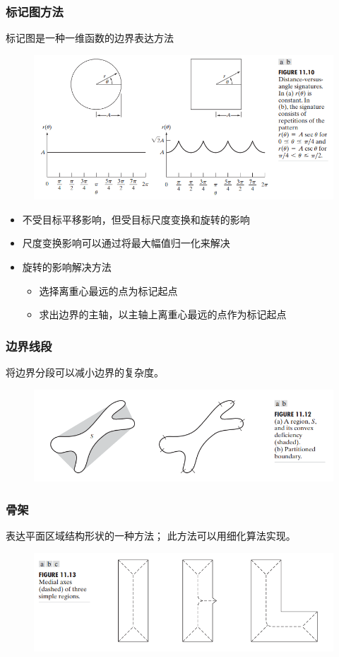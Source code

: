 \subsubsection{标记图方法}
标记图是一种一维函数的边界表达方法
\begin{figure}[H]
\centering
\includegraphics[width=0.8\linewidth]{fig/signature.png}
\end{figure}
\begin{itemize}
\item 不受目标平移影响，但受目标尺度变换和旋转的影响
\item 尺度变换影响可以通过将最大幅值归一化来解决
\item 旋转的影响解决方法
\begin{itemize}
	\item 选择离重心最远的点为标记起点
	\item 求出边界的主轴，以主轴上离重心最远的点作为标记起点
\end{itemize}
\end{itemize}

\subsubsection{边界线段}
将边界分段可以减小边界的复杂度。
\begin{figure}[H]
\centering
\includegraphics[width=0.8\linewidth]{fig/region_segmentation.png}
\end{figure}

\subsubsection{骨架}
表达平面区域结构形状的一种方法；
此方法可以用细化算法实现。
\begin{figure}[H]
\centering
\includegraphics[width=0.8\linewidth]{fig/skeletons.png}
\end{figure}

